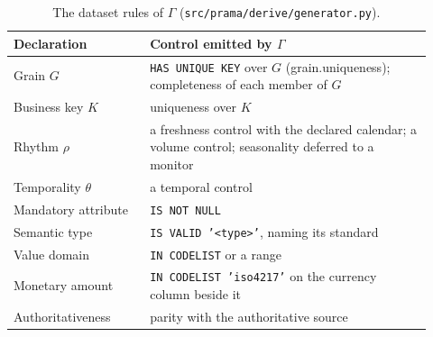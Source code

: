 \documentclass[11pt,a4paper]{article}
\renewcommand{\_}{\oldunderscore\allowbreak}
\theoremstyle{plain}
\theoremstyle{definition}
\theoremstyle{remark}
\newcommand{\Gam}{\Gamma}
\newcommand{\pql}[1]{\texttt{#1}}
\begin{document}
\begin{table}[t]
\centering\small
\begin{tabular}{@{}L{0.30\linewidth}L{0.62\linewidth}@{}}
\toprule
\textbf{Declaration} & \textbf{Control emitted by $\Gam$} \\
\midrule
Grain $G$ & \pql{HAS UNIQUE KEY} over $G$ (\textsf{grain.uniqueness}); completeness of each member of $G$ \\
Business key $K$ & uniqueness over $K$ \\
Rhythm $\rho$ & a freshness control with the declared calendar; a volume control; seasonality deferred to a monitor \\
Temporality $\theta$ & a temporal control \\
Mandatory attribute & \pql{IS NOT NULL} \\
Semantic type & \pql{IS VALID '<type>'}, naming its standard \\
Value domain & \pql{IN CODELIST} or a range \\
Monetary amount & \pql{IN CODELIST 'iso4217'} on the currency column beside it \\
Authoritativeness & parity with the authoritative source \\
\bottomrule
\end{tabular}
\caption{The dataset rules of $\Gam$ (\texttt{src/prama/derive/generator.py}).}\label{tab:gamma}
\end{table}
\end{document}
